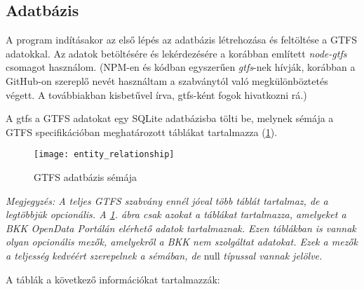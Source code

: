 \subsection{Adatbázis}

A program indításakor az első lépés az adatbázis létrehozása és feltöltése a GTFS adatokkal. Az adatok betöltésére és lekérdezésére a korábban említett \textit{node-gtfs} csomagot használom. (NPM-en és kódban egyszerűen \textit{gtfs}-nek hívják, korábban a GitHub-on szereplő nevét használtam a szabványtól való megkülönböztetés végett. A továbbiakban kisbetűvel írva, gtfs-ként fogok hivatkozni rá.)

A gtfs a GTFS adatokat egy SQLite adatbázisba tölti be, melynek sémája a GTFS specifikációban meghatározott táblákat tartalmazza (\ref{fig:gtfs-schema}). 

\pagebreak

\begin{figure}[H]
    \centering
    \texttt{[image: entity\_relationship]}
    \caption{GTFS adatbázis sémája}
    \label{fig:gtfs-schema}
\end{figure}

\pagebreak

\textit{Megjegyzés: A teljes GTFS szabvány ennél jóval több táblát tartalmaz, de a legtöbbjük opcionális. A \ref{fig:gtfs-schema}. ábra csak azokat a táblákat tartalmazza, amelyeket a BKK OpenData Portálán elérhető adatok tartalmaznak. Ezen táblákban is vannak olyan opcionális mezők, amelyekről a BKK nem szolgáltat adatokat. Ezek a mezők a teljesség kedvéért szerepelnek a sémában, de} null \textit{típussal vannak jelölve.}

A táblák a következő információkat tartalmazzák\cite{gtfsspec}:

